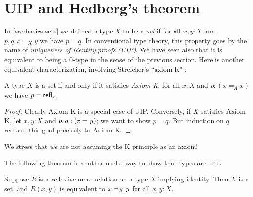 \section{UIP and Hedberg's theorem}
\label{sec:hedberg}

In \autoref{sec:basics-sets} we defined a type $X$ to be a \emph{set} if for all $x, y : X$ and $p, q : x =_X y$ we have $p = q$.
In conventional type theory, this property goes by the name of \emph{uniqueness of identity proofs (UIP)}.
We have seen also that it is equivalent to being a $0$-type in the sense of the previous section.
Here is another equivalent characterization, involving Streicher's ``axiom K" \cite{StreicherK}:

\begin{thm}\label{thm:h-set-uip-K}
 A type $X$ is a set if and only if it satisfies \emph{Axiom K}: for all $x : X$ and $p : (x =_A x)$ we have $p = \refl{x}$.
\end{thm}

\begin{proof}
  Clearly Axiom K is a special case of UIP.
  Conversely, if $X$ satisfies Axiom K, let $x, y : X$ and $p, q : (\id{x}{y})$; we want to show $p=q$.
  But induction on $q$ reduces this goal precisely to Axiom K.
\end{proof}

We stress that \emph{we} are not assuming the K principle as an axiom!

The following theorem is another useful way to show that types are sets.

\begin{thm}\label{thm:h-set-refrel-in-paths-sets}
  Suppose $R$ is a reflexive mere relation on a type $X$ implying identity.
  Then $X$ is a set, and $R(x,y)$ is equivalent to $\id[X]{x}{y}$ for all $x,y:X$.
\end{thm}

